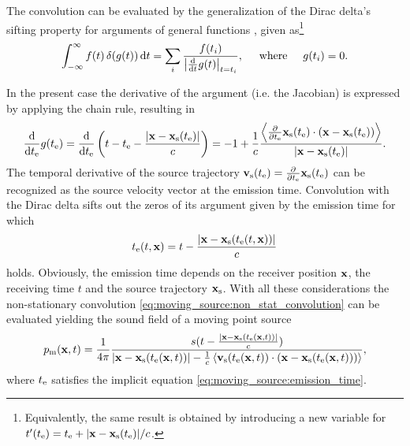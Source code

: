 The convolution can be evaluated by the generalization of the Dirac delta's sifting property for arguments of general functions \cite{Dowling1983, Crighton1992, Jackson1999}, given as\footnote{Equivalently, the same result is obtained by introducing a new variable for $t'(t_{\mathrm{e}}) = t_{\mathrm{e}} + |\mathbf{x}-\mathbf{x}_{\mathrm{s}}(t_{\mathrm{e}})|/c$.}
\begin{equation}
\int_{-\infty}^{\infty} f(t) \, \delta(g(t)) \, \mathrm{d} t = \sum_{i} \frac{f(t_i)}{\left| \frac{\mathrm{d}}{\mathrm{d} t} g(t) \right|_{t = t_i}}, \hspace{5mm} \text{where} \hspace{5mm} g(t_i) = 0.
\end{equation}

In the present case the derivative of the argument (i.e. the Jacobian) is expressed by applying the chain rule, resulting in
\begin{equation}
\label{eq:moving_source:jacobian}
\frac{\mathrm{d} }{\mathrm{d} t_{\mathrm{e}}} g(t_{\mathrm{e}}) = 
\frac{\mathrm{d} }{\mathrm{d} t_{\mathrm{e}}} \left( t - t_{\mathrm{e}} - \frac{|\mathbf{x}-\mathbf{x}_{\mathrm{s}}(t_{\mathrm{e}})|}{c}  \right) =
- 1 + \frac{1}{c} \frac{\left< \frac{\partial}{\partial t_{\mathrm{e}}} \mathbf{x}_{\mathrm{s}}(t_{\mathrm{e}}) \cdot (\mathbf{x}-\mathbf{x}_{\mathrm{s}}(t_{\mathrm{e}}))\right> }{|\mathbf{x}-\mathbf{x}_{\mathrm{s}}(t_{\mathrm{e}})|}.
\end{equation}
The temporal derivative of the source trajectory $\mathbf{v}_{\mathrm{s}}(t_{\mathrm{e}}) = \frac{\partial}{\partial t_{\mathrm{e}}}\mathbf{x}_{\mathrm{s}}(t_{\mathrm{e}})$ can be recognized as the source velocity vector at the emission time.
Convolution with the Dirac delta sifts out the zeros of its argument given by the emission time for which
\begin{equation}
\label{eq:moving_source:emission_time}
t_{\mathrm{e}}(t,\mathbf{x}) = t - \frac{|\mathbf{x}-\mathbf{x}_{\mathrm{s}}(t_{\mathrm{e}}(t,\mathbf{x}))|}{c}
\end{equation}
holds.
Obviously, the emission time depends on the receiver position $\mathbf{x}$, the receiving time $t$ and the source trajectory $\mathbf{x}_{\mathrm{s}}$.
With all these considerations the non-stationary convolution \eqref{eq:moving_source:non_stat_convolution} can be evaluated yielding the sound field of a moving point source
\begin{equation}
p_{\mathrm{m}}(\mathbf{x},t) =
\frac{1}{4\pi} \frac{ s(t - \frac{|\mathbf{x}-\mathbf{x}_{\mathrm{s}}(t_{\mathrm{e}}(\mathbf{x},t))|}{c} ) }{|\mathbf{x}-\mathbf{x}_{\mathrm{s}}(t_{\mathrm{e}}(\mathbf{x},t))| - \frac{1}{c}\left< \mathbf{v}_{\mathrm{s}}(t_{\mathrm{e}}(\mathbf{x},t)) \cdot (\mathbf{x}-\mathbf{x}_{\mathrm{s}}(t_{\mathrm{e}}(\mathbf{x},t)))\right> },
\end{equation}
where $t_{\mathrm{e}}$ satisfies the implicit equation \eqref{eq:moving_source:emission_time}.

